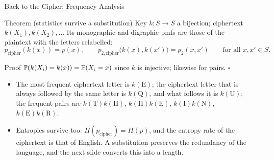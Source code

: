 \begin{frame}{Back to the Cipher: Frequency Analysis}
  \small
  \begin{block}{Theorem (statistics survive a substitution)}
    Key $k\colon S\to S$ a bijection; ciphertext $k(X_1),k(X_2),\dots$ Its monographic and digraphic pmfs are those of the plaintext with the letters relabelled:
    \[
      p_{\text{cipher}}(k(x))=p(x),\qquad p_{2,\text{cipher}}\big(k(x),k(x')\big)=p_2(x,x')\qquad\text{for all }x,x'\in S .
    \]
  \end{block}
  \begin{block}{Proof}
    $\mathbb{P}(k(X_i)=k(x))=\mathbb{P}(X_i=x)$ since $k$ is injective; likewise for pairs. \hfill$\square$
  \end{block}
  \begin{itemize}
    \item The most frequent ciphertext letter is $k(\mathrm E)$; the ciphertext letter that is always followed by the same letter is $k(\mathrm Q)$, and what follows it is $k(\mathrm U)$; the frequent pairs are $k(\mathrm T)k(\mathrm H)$, $k(\mathrm H)k(\mathrm E)$, $k(\mathrm I)k(\mathrm N)$, $k(\mathrm E)k(\mathrm R)$.
    \item Entropies survive too: $H(p_{\text{cipher}})=H(p)$, and the entropy rate of the ciphertext is that of English. A substitution preserves the redundancy of the language, and the next slide converts this into a length.
  \end{itemize}
\end{frame}

